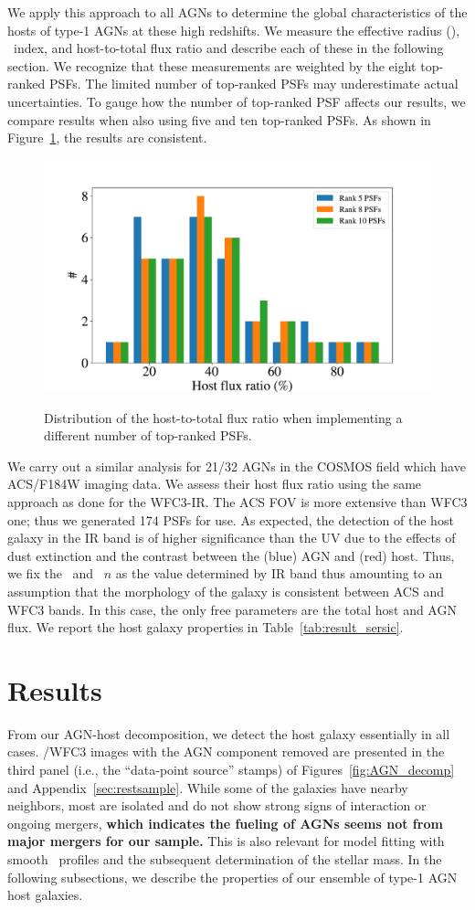 \documentclass[apj]{emulateapj}
\begin{document}
We apply this approach to all AGNs to determine the global characteristics of the hosts of type-1 AGNs at these high redshifts. We measure the effective radius (\Reff), \sersic\ index, and host-to-total flux ratio and describe each of these in the following section. We recognize that these measurements are weighted by the eight top-ranked PSFs. The limited number of top-ranked PSFs may underestimate actual uncertainties. To gauge how the number of top-ranked PSF affects our results, we compare results when also using five and ten top-ranked PSFs. As shown in Figure~\ref{fig:hist_compare}, the results are consistent.

\begin{figure}
\centering
{
\includegraphics[height=0.25\textwidth]{fig/hist_compare.pdf}
}
\caption{\label{fig:hist_compare} 
Distribution of the host-to-total flux ratio when implementing a different number of top-ranked PSFs.}
\end{figure} 


We carry out a similar analysis for 21/32 AGNs in the COSMOS field which have ACS/F184W imaging data. We assess their host flux ratio using the same approach as done for the WFC3-IR. The ACS FOV is more extensive than WFC3 one; thus we generated 174 PSFs for use. As expected, the detection of the host galaxy in the IR band is of higher significance than the UV due to the effects of dust extinction and the contrast between the (blue) AGN and (red) host. Thus, we fix the \Reff\ and \sersic\ $n$ as the value determined by IR band thus amounting to an assumption that the morphology of the galaxy is consistent between ACS and WFC3 bands. In this case, the only free parameters are the total host and AGN flux. We report the host galaxy properties in Table~\ref{tab:result_sersic}.


\section{Results}
\label{sec:result}

From our AGN-host decomposition, we detect the host galaxy essentially in all cases. \hst/WFC3 images with the AGN component removed are presented in the third panel (i.e., the ``data-point source'' stamps) of Figures~\ref{fig:AGN_decomp} and Appendix~\ref{sec:restsample}. While some of the galaxies have nearby neighbors, most are isolated and do not show strong signs of interaction or ongoing mergers, {\bf which indicates the fueling of AGNs seems not from major mergers for our sample.} This is also relevant for model fitting with smooth \sersic\ profiles and the subsequent determination of the stellar mass. In the following subsections, we describe the properties of our ensemble of type-1 AGN host galaxies.
 
\end{document}
